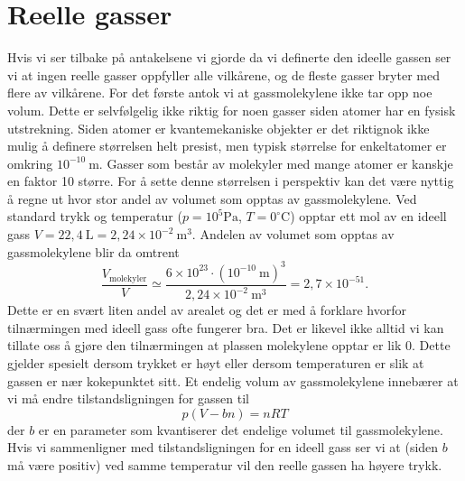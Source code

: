 \section{Reelle gasser}
\label{sec:kinetiskgassteori:reellgass}
Hvis vi ser tilbake på antakelsene vi gjorde da vi definerte den ideelle gassen ser vi at ingen reelle gasser oppfyller alle vilkårene, og de fleste gasser bryter med flere av vilkårene. For det første antok vi at gassmolekylene ikke tar opp noe volum. Dette er selvfølgelig ikke riktig for noen gasser siden atomer har en fysisk utstrekning. Siden atomer er kvantemekaniske objekter er det riktignok ikke mulig å definere størrelsen helt presist, men typisk størrelse for enkeltatomer er omkring $10^{-10}~\mathrm{m}$. Gasser som består av molekyler med mange atomer er kanskje en faktor 10 større. For å sette denne størrelsen i perspektiv kan det være nyttig å regne ut hvor stor andel av volumet som opptas av gassmolekylene. Ved standard trykk og temperatur ($p=10^5\mathrm{Pa}$, $T=0^\circ\mathrm{C}$) opptar ett mol av en ideell gass $V = 22,4~\mathrm{L} = 2,24\times10^{-2}~\mathrm{m^3}$. Andelen av volumet som opptas av gassmolekylene blir da omtrent
\begin{displaymath}
	\frac{V_\text{molekyler}}{V} \simeq \frac{6\times10^{23}\cdot(10^{-10}~\mathrm{m})^3}{2,24\times10^{-2}~\mathrm{m^3}} = 2,7\times10^{-51}.
\end{displaymath}
Dette er en svært liten andel av arealet og det er med å forklare hvorfor tilnærmingen med ideell gass ofte fungerer bra. Det er likevel ikke alltid vi kan tillate oss å gjøre den tilnærmingen at plassen molekylene opptar er lik 0. Dette gjelder spesielt dersom trykket er høyt eller dersom temperaturen er slik at gassen er nær kokepunktet sitt. Et endelig volum av gassmolekylene innebærer at vi må endre tilstandsligningen for gassen til
\begin{displaymath}
	p(V-bn) = nRT
\end{displaymath}
der $b$ er en parameter som kvantiserer det endelige volumet til gassmolekylene. Hvis vi sammenligner med tilstandsligningen for en ideell gass ser vi at (siden $b$ må være positiv) ved samme temperatur vil den reelle gassen ha høyere trykk.

